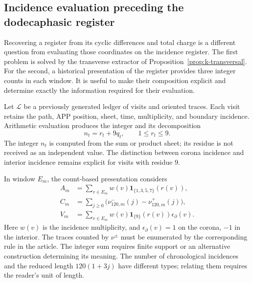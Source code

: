 \subsection{Incidence evaluation preceding the dodecaphasic register}
\label{subsec:registro-evaluacion-incidencial}

Recovering a register from its cyclic differences and
total charge is a different question from evaluating those coordinates
on the incidence register. The first problem is solved by the
transverse extractor of Proposition~\ref{prop:k-transversal}.
For the second, a historical presentation of the
register provides three integer counts in each window. It is useful
to make their composition explicit and determine exactly the information
required for their evaluation.

Let \(\mathscr L\) be a previously generated ledger of visits and oriented
traces. Each visit retains the path, APP position, sheet,
time, multiplicity, and boundary incidence. Arithmetic
evaluation produces the integer and its decomposition
\[
 n_t=r_t+9q_t,\qquad 1\leq r_t\leq9.
\]
The integer \(n_t\) is computed from the sum or product sheet; its
residue is not received as an independent value. The distinction between
corona incidence and interior incidence remains explicit for
visits with residue \(9\).

In window \(E_m\), the count-based presentation considers
\begin{align}
 A_m&=\sum_{v\in E_m}w(v)
             \mathbf1_{\{1,3,5,7\}}(r(v)),\\
 C_m&=\sum_{j\geq0}\bigl(\nu^-_{120,m}(j)-\nu^+_{120,m}(j)\bigr),\\
 V_m&=\sum_{v\in E_m}w(v)\mathbf1_{\{9\}}(r(v))\epsilon_\partial(v).
\end{align}
Here \(w(v)\) is the incidence multiplicity, and
\(\epsilon_\partial(v)=1\) on the corona, \(-1\) in the interior.
The traces counted by \(\nu^\pm\) must be enumerated by the
corresponding rule in the article. The integer sum requires finite support or an
alternative construction determining its meaning. The number of
chronological incidences and the reduced length \(120(1+3j)\) have
different types; relating them requires the reader's unit of length.

